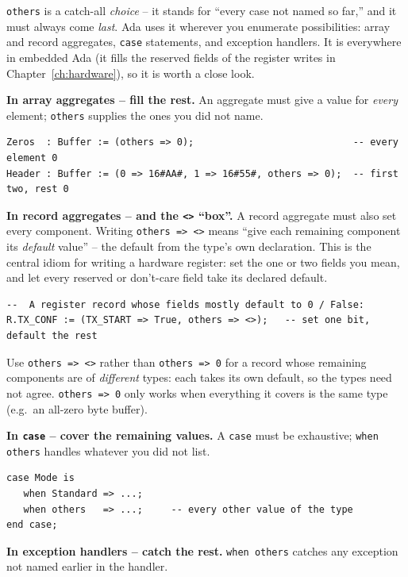 \texttt{others} is a catch-all \emph{choice} -- it stands for ``every case not
named so far,'' and it must always come \emph{last}. Ada uses it wherever you
enumerate possibilities: array and record aggregates, \texttt{case} statements,
and exception handlers. It is everywhere in embedded Ada (it fills the reserved
fields of the register writes in Chapter~\ref{ch:hardware}), so it is worth a
close look.

\textbf{In array aggregates -- fill the rest.} An aggregate must give a value for
\emph{every} element; \texttt{others} supplies the ones you did not name.

\begin{lstlisting}
Zeros  : Buffer := (others => 0);                            -- every element 0
Header : Buffer := (0 => 16#AA#, 1 => 16#55#, others => 0);  -- first two, rest 0
\end{lstlisting}

\textbf{In record aggregates -- and the \texttt{<>} ``box''.} A record aggregate
must also set every component. Writing \texttt{others => <>} means ``give each
remaining component its \emph{default} value'' -- the default from the type's
own declaration. This is the central idiom for writing a hardware register: set
the one or two fields you mean, and let every reserved or don't-care field take
its declared default.

\begin{lstlisting}
--  A register record whose fields mostly default to 0 / False:
R.TX_CONF := (TX_START => True, others => <>);   -- set one bit, default the rest
\end{lstlisting}

Use \texttt{others => <>} rather than \texttt{others => 0} for a record whose
remaining components are of \emph{different} types: each takes its own default, so
the types need not agree. \texttt{others => 0} only works when everything it
covers is the same type (e.g.\ an all-zero byte buffer).

\textbf{In \texttt{case} -- cover the remaining values.} A \texttt{case} must be
exhaustive; \texttt{when others} handles whatever you did not list.

\begin{lstlisting}
case Mode is
   when Standard => ...;
   when others   => ...;     -- every other value of the type
end case;
\end{lstlisting}

\textbf{In exception handlers -- catch the rest.} \texttt{when others} catches
any exception not named earlier in the handler.

